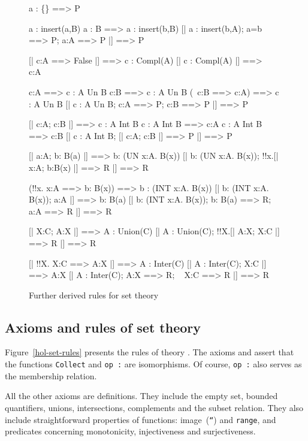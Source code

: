 \begin{figure} \underscoreon
\begin{ttbox}
   a : \{\} ==> P

 a : insert(a,B)
 a : B ==> a : insert(b,B)
  [| a : insert(b,A);  a=b ==> P;  a:A ==> P |] ==> P

   [| c:A ==> False |] ==> c : Compl(A)
   [| c : Compl(A) |] ==> ~ c:A

     c:A ==> c : A Un B
     c:B ==> c : A Un B
     (~c:B ==> c:A) ==> c : A Un B
      [| c : A Un B;  c:A ==> P;  c:B ==> P |] ==> P

     [| c:A;  c:B |] ==> c : A Int B
    c : A Int B ==> c:A
    c : A Int B ==> c:B
     [| c : A Int B;  [| c:A; c:B |] ==> P |] ==> P

     [| a:A;  b: B(a) |] ==> b: (UN x:A. B(x))
     [| b: (UN x:A. B(x));  !!x.[| x:A;  b:B(x) |] ==> R |] ==> R

    (!!x. x:A ==> b: B(x)) ==> b : (INT x:A. B(x))
    [| b: (INT x:A. B(x));  a:A |] ==> b: B(a)
    [| b: (INT x:A. B(x));  b: B(a) ==> R;  ~ a:A ==> R |] ==> R

   [| X:C;  A:X |] ==> A : Union(C)
   [| A : Union(C);  !!X.[| A:X;  X:C |] ==> R |] ==> R

   [| !!X. X:C ==> A:X |] ==> A : Inter(C)
   [| A : Inter(C);  X:C |] ==> A:X
   [| A : Inter(C);  A:X ==> R;  ~ X:C ==> R |] ==> R
\end{ttbox}
\caption{Further derived rules for set theory} \label{hol-set2}
\end{figure}


\subsection{Axioms and rules of set theory}
Figure~\ref{hol-set-rules} presents the rules of theory .  The
axioms  and  assert
that the functions {\tt Collect} and \hbox{\tt op :} are isomorphisms.  Of
course, \hbox{\tt op :} also serves as the membership relation.

All the other axioms are definitions.  They include the empty set, bounded
quantifiers, unions, intersections, complements and the subset relation.
They also include straightforward properties of functions: image~({\tt``}) and
{\tt range}, and predicates concerning monotonicity, injectiveness and
surjectiveness.  

